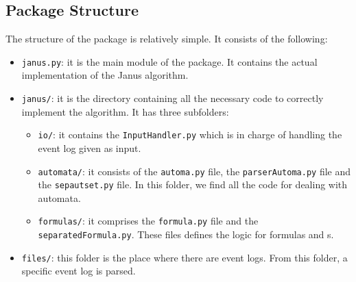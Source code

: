 \subsection{Package Structure}
The structure of the \janus package is relatively simple. It consists of the following:
\begin{itemize}
\item \texttt{janus.py}: it is the main module of the package. It contains the actual implementation of the Janus algorithm.
\item \texttt{janus/}: it is the directory containing all the necessary code to correctly implement the algorithm. It has three subfolders:
\begin{itemize}
\item  \texttt{io/}: it contains the \texttt{InputHandler.py} which is in charge of handling the event log given as input.
\item \texttt{automata/}: it consists of the \texttt{automa.py} file, the \texttt{parserAutoma.py} file and the \texttt{sepautset.py} file. In this folder, we find all the code for dealing with automata.
\item \texttt{formulas/}: it comprises the \texttt{formula.py} file and the \texttt{separatedFormula.py}. These files defines the logic for \LTLp formulas and \rcon s.
\end{itemize}
\item \texttt{files/}: this folder is the place where there are event logs. From this folder, a specific event log is parsed.
\end{itemize}
